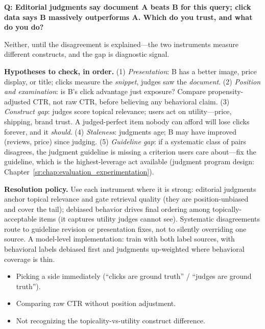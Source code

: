 \begin{interviewq}
\textbf{Q: Editorial judgments say document A beats B for this query; click data says B massively outperforms A. Which do you trust, and what do you do?}

 \quad {} \quad \badgefreq{\freqmed}

\stronganswer

Neither, until the disagreement is explained---the two instruments measure different constructs, and the gap is diagnostic signal.

\textbf{Hypotheses to check, in order.} (1) \textit{Presentation}: B has a better image, price display, or title; clicks measure the \textit{snippet}, judges saw the \textit{document}. (2) \textit{Position and examination}: is B's click advantage just exposure? Compare propensity-adjusted CTR, not raw CTR, before believing any behavioral claim. (3) \textit{Construct gap}: judges score topical relevance; users act on utility---price, shipping, brand trust. A judged-perfect item nobody can afford will lose clicks forever, and it \textit{should}. (4) \textit{Staleness}: judgments age; B may have improved (reviews, price) since judging. (5) \textit{Guideline gap}: if a systematic class of pairs disagrees, the judgment guideline is missing a criterion users care about---fix the guideline, which is the highest-leverage act available (judgment program design: Chapter~\ref{sr:chap:evaluation_experimentation}).

\textbf{Resolution policy.} Use each instrument where it is strong: editorial judgments anchor topical relevance and gate retrieval quality (they are position-unbiased and cover the tail); debiased behavior drives final ordering among topically-acceptable items (it captures utility judges cannot see). Systematic disagreements route to guideline revision or presentation fixes, not to silently overriding one source. A model-level implementation: train with both label sources, with behavioral labels debiased first and judgments up-weighted where behavioral coverage is thin.

\redflags
\begin{itemize}
    \item Picking a side immediately (``clicks are ground truth'' / ``judges are ground truth'').
    \item Comparing raw CTR without position adjustment.
    \item Not recognizing the topicality-vs-utility construct difference.
\end{itemize}


\end{interviewq}
